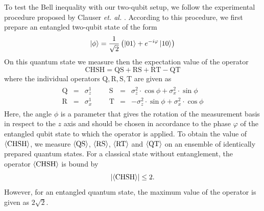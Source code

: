 To test the Bell inequality with our two-qubit setup, we follow the experimental procedure proposed by Clauser {\it et. al.} \citep{clauser_proposed_1969}. According to this procedure, we first prepare an entangled two-qubit state of the form
%
\begin{equation}
\left| \phi \right> = \frac{1}{\sqrt{2}}\left(\left| 01 \right>+e^{-i\varphi}\left| 10 \right>\right) \label{eq:chsh_state}
\end{equation}
%
On this quantum state we measure then the expectation value of the operator
%
\begin{equation}
\mathrm{CHSH} = \mathrm{QS}+\mathrm{RS}+\mathrm{RT}-\mathrm{QT}
\end{equation}
%
where the individual operators $\mathrm{Q,R,S,T}$ are given as
%
\begin{eqnarray}
	\begin{array}{cccccccc}
		\mathrm{Q} & = & \sigma_z^1 &&& \mathrm{S} & = & \sigma_z^2\cdot \cos{\phi}+\sigma_x^2 \cdot \sin{\phi} \\
		\mathrm{R} & = & \sigma_x^1 &&& \mathrm{T} & = & -\sigma_z^2\cdot \sin{\phi}+\sigma_x^2 \cdot \cos{\phi}
	\end{array}
\end{eqnarray} 
%
Here, the angle $\phi$ is a parameter that gives the rotation of the measurement basis in respect to the $z$ axis and should be chosen in accordance to the phase $\varphi$ of the entangled qubit state to which the operator is applied. To obtain the value of $\left< \mathrm{CHSH} \right>$, we measure $\left< \mathrm{QS} \right>$, $\left< \mathrm{RS} \right>$, $\left< \mathrm{RT} \right>$ and $\left< \mathrm{QT} \right>$ on an ensemble of identically prepared quantum states. For a classical state without entanglement, the operator $\left< \mathrm{CHSH} \right>$ is bound by
%
\begin{equation}
\left|\left< \mathrm{CHSH} \right>\right| \le 2. \label{eq:chsh_max}
\end{equation}
%
However, for an entangled quantum state, the maximum value of the operator is given as $2\sqrt{2}$. 

\smallskip

